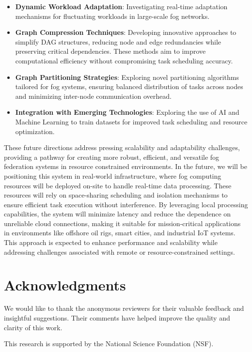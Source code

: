 \documentclass[conference]{IEEEtran}
\begin{document}
\begin{itemize}
\item \textbf{Dynamic Workload Adaptation}: Investigating real-time adaptation mechanisms for fluctuating workloads in large-scale fog networks.

\item \textbf{Graph Compression Techniques}: Developing innovative approaches to simplify DAG structures, reducing node and edge redundancies while preserving critical dependencies. These methods aim to improve computational efficiency without compromising task scheduling accuracy.

\item \textbf{Graph Partitioning Strategies}: Exploring novel partitioning algorithms tailored for fog systems, ensuring balanced distribution of tasks across nodes and minimizing inter-node communication overhead.
\item \textbf{Integration with Emerging Technologies}: Exploring the use of AI and Machine Learning to train datasets for improved task scheduling and resource optimization.
\end{itemize}
These future directions address pressing scalability and adaptability challenges, providing a pathway for creating more robust, efficient, and versatile  fog federation systems in resource constrained environments.
In the future, we will be positioning this system in real-world infrastructure, where fog computing resources will be deployed on-site to handle real-time data processing. These resources will rely on space-sharing scheduling and isolation mechanisms to ensure efficient task execution without interference. By leveraging local processing capabilities, the system will minimize latency and reduce the dependence on unreliable cloud connections, making it suitable for mission-critical applications in environments like offshore oil rigs, smart cities, and industrial IoT systems. This approach is expected to enhance performance and scalability while addressing challenges associated with remote or resource-constrained settings.

\section*{Acknowledgments}

We would like to thank the anonymous reviewers for their valuable feedback and insightful suggestions. Their comments have helped improve the quality and clarity of this work. 

This research is supported by the National Science Foundation (NSF).


\balance

\end{document}
